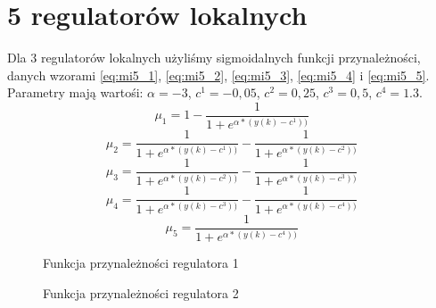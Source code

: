 \section{5 regulatorów lokalnych}
Dla 3 regulatorów lokalnych użyliśmy sigmoidalnych funkcji przynależności, danych wzorami \ref{eq:mi5_1}, \ref{eq:mi5_2}, \ref{eq:mi5_3}, \ref{eq:mi5_4} i \ref{eq:mi5_5}. Parametry mają wartośi: $\alpha = -3$, $c^1 = -0,05$, $c^2=0,25$, $c^3=0,5$, $c^4=1.3$.
\begin{equation} \label{eq:mi5_1}
\mu_1 = 1 - \frac{1}{1+e^{\alpha * (y(k)-c^1))}}
\end{equation}
\begin{equation} \label{eq:mi5_2}
\mu_2 = \frac{1}{1+e^{\alpha * (y(k)-c^1))}} - \frac{1}{1+e^{\alpha * (y(k)-c^2))}}
\end{equation}
\begin{equation} \label{eq:mi5_3}
\mu_3 = \frac{1}{1+e^{\alpha * (y(k)-c^2))}} - \frac{1}{1+e^{\alpha * (y(k)-c^3))}}
\end{equation}
\begin{equation} \label{eq:mi5_4}
\mu_4 = \frac{1}{1+e^{\alpha * (y(k)-c^3))}} - \frac{1}{1+e^{\alpha * (y(k)-c^4))}}
\end{equation}
\begin{equation} \label{eq:mi5_5}
\mu_5 = \frac{1}{1+e^{\alpha * (y(k)-c^4))}}
\end{equation}

\begin{figure}[H]
\centering
{}
\caption{Funkcja przynależności regulatora 1}
\label{fig:mi5_1}
\end{figure}

\begin{figure}[H]
\centering
{}
\caption{Funkcja przynależności regulatora 2}
\label{fig:mi5_2}
\end{figure}

